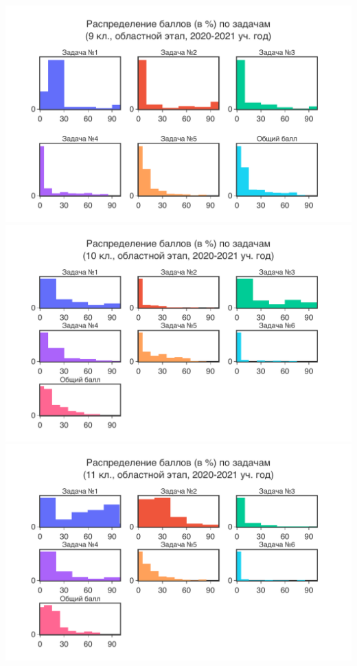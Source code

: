 \includegraphics[width=\linewidth]{../export/pdf/results/2023/oblast/grade9-dist-problemwise.pdf}
\includegraphics[width=\linewidth]{../export/pdf/results/2023/oblast/grade10-dist-problemwise.pdf}
\includegraphics[width=\linewidth]{../export/pdf/results/2023/oblast/grade11-dist-problemwise.pdf}

